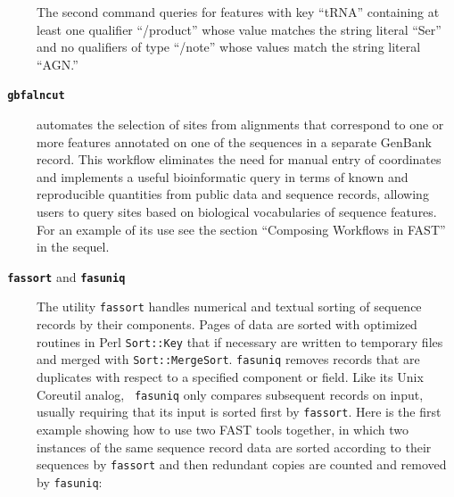 \documentclass{frontiersSCNS} %
\begin{document}
\begin{description}
The second command queries for features with key ``tRNA'' containing
at least one qualifier ``/product'' whose value matches the string literal
``Ser'' and no qualifiers of type ``/note'' whose values match the
string literal ``AGN.''
\\
\item[\texttt{\textbf{  gbfalncut}} ] automates the selection of sites from
alignments that correspond to one or more features annotated on one of
the sequences in a separate GenBank record. This workflow eliminates
the need for manual entry of coordinates and implements a useful
bioinformatic query in terms of known and reproducible quantities from
public data and sequence records, allowing users to query sites based
on biological vocabularies of sequence features. For an example of its
use see the section ``Composing Workflows in FAST'' in the sequel.
\\
\item[\texttt{\textbf{ fassort}} and \texttt{\textbf{fasuniq}} ] The
  utility {\tt fassort} handles numerical and textual sorting of
  sequence records by their components. Pages of data are sorted with
  optimized routines in Perl {\tt Sort::Key} that if necessary are
  written to temporary files and merged with {\tt Sort::MergeSort}.
  {\tt fasuniq} removes records that are duplicates with respect to a
  specified component or field. Like its Unix Coreutil analog, {\tt
    fasuniq} only compares subsequent records on input, usually
  requiring that its input is sorted first by {\tt fassort}. Here is
  the first example showing how to use two FAST tools together, in
  which two instances of the same sequence record data are sorted
  according to their sequences by {\tt fassort} and then redundant
  copies are counted and removed by {\tt fasuniq}:


\end{description}
\end{document}

